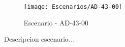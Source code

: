 \begin{figure}[H]
\centering
\texttt{[image: Escenarios/AD-43-00]}
\caption{Escenario - AD-43-00}
\label{fig:AD-43-00}
\end{figure}

Descripcion escenario...
\clearpage

